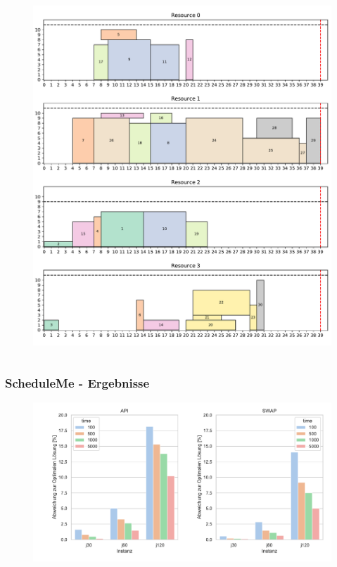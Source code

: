 \documentclass[aspectratio=169]{beamer}
\begin{document}
\begin{frame}
\begin{columns}[c]
		\begin{figure}
			\centering
			\includegraphics[scale=0.25]{example_plot_sa_swap.pdf}
		\end{figure}	
		
	\end{columns}
\end{frame}


\begin{frame}[t]
	\frametitle{ScheduleMe - Ergebnisse}
	\vspace{-12pt}
	\begin{figure}
		\centering
		\includegraphics[scale=0.55]{result1.pdf}
	\end{figure}	
\end{frame}
\end{document}
